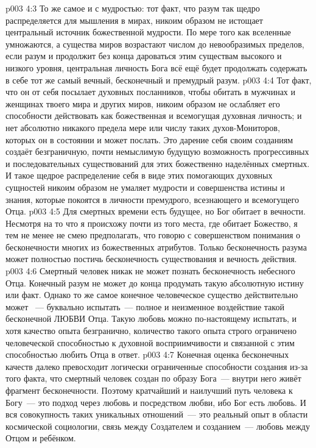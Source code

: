 \vs p003 4:3 То же самое и с мудростью: тот факт, что разум так щедро распределяется для мышления в мирах, никоим образом не истощает центральный источник божественной мудрости. По мере того как вселенные умножаются, а существа миров возрастают числом до невообразимых пределов, если разум и продолжит без конца дароваться этим существам высокого и низкого уровня, центральная личность Бога всё ещё будет продолжать содержать в себе тот же самый вечный, бесконечный и премудрый разум.
\vs p003 4:4 Тот факт, что он от себя посылает духовных посланников, чтобы обитать в мужчинах и женщинах твоего мира и других миров, никоим образом не ослабляет его способности действовать как божественная и всемогущая духовная личность; и нет абсолютно никакого предела мере или числу таких духов\hyp{}Мониторов, которых он в состоянии и может послать. Это дарение себя своим созданиям создаёт безграничную, почти немыслимую будущую возможность прогрессивных и последовательных существований для этих божественно наделённых смертных. И такое щедрое распределение себя в виде этих помогающих духовных сущностей никоим образом не умаляет мудрости и совершенства истины и знания, которые покоятся в личности премудрого, всезнающего и всемогущего Отца.
\vs p003 4:5 \pc Для смертных времени есть будущее, но Бог обитает в вечности. Несмотря на то что я происхожу почти из того места, где обитает Божество, я тем не менее не смею предполагать, что говорю с совершенством понимания о бесконечности многих из божественных атрибутов. Только бесконечность разума может полностью постичь бесконечность существования и вечность действия.
\vs p003 4:6 \pc Смертный человек никак не может познать бесконечность небесного Отца. Конечный разум не может до конца продумать такую абсолютную истину или факт. Однако то же самое конечное человеческое существо действительно может ~--- буквально испытать~--- полное и неизменное воздействие такой бесконечной ЛЮБВИ Отца. Такую любовь можно по\hyp{}настоящему испытать, и хотя качество опыта безгранично, количество такого опыта строго ограничено человеческой способностью к духовной восприимчивости и связанной с этим способностью любить Отца в ответ.
\vs p003 4:7 Конечная оценка бесконечных качеств далеко превосходит логически ограниченные способности создания из-за того факта, что смертный человек создан по образу Бога~--- внутри него живёт фрагмент бесконечности. Поэтому кратчайший и наилучший путь человека к Богу~--- это подход через любовь и посредством любви, ибо Бог есть любовь. И вся совокупность таких уникальных отношений~--- это реальный опыт в области космической социологии, связь между Создателем и созданием~--- любовь между Отцом и ребёнком.
